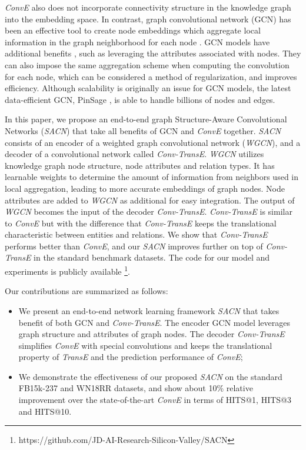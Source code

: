 \documentclass[letterpaper]{article} \usepackage{aaai19}  \usepackage{times}  \usepackage{helvet}  \usepackage{courier}  \usepackage{url}  \usepackage{graphicx}  \usepackage{amsmath}
\begin{document}
{\it ConvE} also does not incorporate connectivity structure in the knowledge graph into the embedding space. In contrast, graph convolutional network (GCN) has been an effective tool to create node embeddings which aggregate local information in the graph neighborhood for each node  \cite{kipf2016semi,hamilton2017inductive,kipf2016nipsws,pham2017aaai,shang2018edge}.
GCN models have additional benefits \cite{hamilton2017representation}, such as leveraging the attributes associated with nodes. They can also impose the same aggregation scheme when computing the convolution for each node, which can be considered a method of regularization, and improves efficiency. Although scalability is originally an issue for GCN models, the latest data-efficient GCN, PinSage \cite{ying2018kdd}, is able to handle billions of nodes and edges.

In this paper, we propose an end-to-end graph Structure-Aware Convolutional Networks ({\it SACN}) that take all benefits of GCN and {\it ConvE} together. {\it SACN} consists of an encoder of a weighted graph convolutional network ({\it WGCN}), and a decoder of a convolutional network called {\it Conv-TransE}. {\it WGCN} utilizes knowledge graph node structure, node attributes and relation types. It has learnable weights to determine the amount of information from neighbors used in local aggregation, leading to more accurate embeddings of graph nodes. Node attributes are added to {\it WGCN} as additional for easy integration. The output of {\it WGCN} becomes the input of the decoder {\it Conv-TransE}. {\it Conv-TransE} is similar to {\it ConvE} but with the difference that {\it Conv-TransE} keeps the translational characteristic between entities and relations. We show that {\it Conv-TransE} performs better than {\it ConvE}, and our {\it SACN} improves further on top of {\it Conv-TransE} in the standard benchmark datasets. 
The code for our model and experiments is publicly available \footnote{https://github.com/JD-AI-Research-Silicon-Valley/SACN}.


Our contributions are summarized as follows:
\begin{itemize}
\item We present an end-to-end network learning framework {\it SACN} that takes benefit of both GCN and {\it Conv-TransE}. The encoder GCN model leverages graph structure and attributes of graph nodes. The decoder \textit{Conv-TransE} simplifies {\it ConvE} with special convolutions and keeps the translational property of {\it TransE} and the prediction performance of {\it ConvE};
\item We demonstrate the effectiveness of our proposed {\it SACN} on the standard FB15k-237 and WN18RR datasets, and show about 10\% relative improvement over the state-of-the-art {\it ConvE} in terms of HITS@1, HITS@3 and HITS@10.
\end{itemize}
\end{document}
